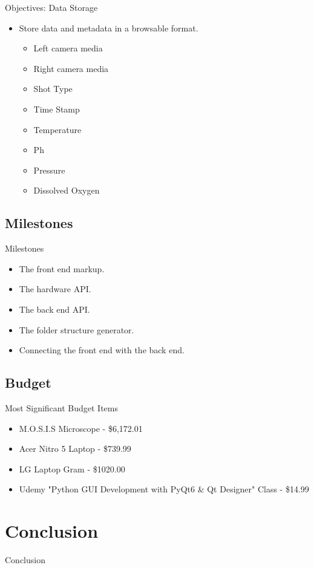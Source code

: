 \documentclass[14pt, aspectratio=169]{beamer}
\begin{document}
\begin{frame}{Objectives: Data Storage}
	\begin{itemize}
		\item Store data and metadata in a browsable format.
		      \begin{itemize}
			      \item Left camera media
			      \item Right camera media
			      \item Shot Type
			      \item Time Stamp
			      \item Temperature
			      \item Ph
			      \item Pressure
			      \item Dissolved Oxygen
		      \end{itemize}
	\end{itemize}
\end{frame}
\subsection{Milestones}
\begin{frame}{Milestones}
	\begin{itemize}
		\item The front end markup.
		\item The hardware API.
		\item The back end API.
		\item The folder structure generator.
		\item Connecting the front end with the back end.
	\end{itemize}
\end{frame}
\subsection{Budget}
\begin{frame}{Most Significant Budget Items}
	\begin{itemize}
		\item M.O.S.I.S Microscope - \$6,172.01
		\item Acer Nitro 5 Laptop - \$739.99
		\item LG Laptop Gram - \$1020.00
		\item Udemy "Python GUI Development with PyQt6 \& Qt Designer" Class - \$14.99
	\end{itemize}
\end{frame}
\section{Conclusion}
\begin{frame}{Conclusion}

\end{frame}
\end{document}
